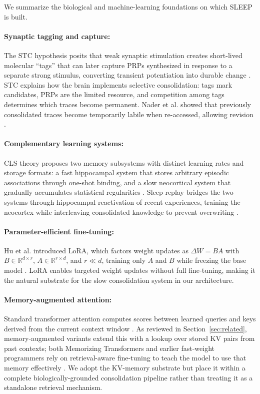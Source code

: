 We summarize the biological and machine-learning foundations on which SLEEP is built.

\paragraph{Synaptic tagging and capture:}
The STC hypothesis posits that weak synaptic stimulation creates short-lived molecular ``tags'' that can later capture PRPs synthesized in response to a separate strong stimulus, converting transient potentiation into durable change \citep{frey1997synaptic,redondo2011making}. STC explains how the brain implements selective consolidation: tags mark candidates, PRPs are the limited resource, and competition among tags determines which traces become permanent. Nader et al. showed that previously consolidated traces become temporarily labile when re-accessed, allowing revision \citep{nader2000fear}.

\paragraph{Complementary learning systems:}
CLS theory proposes two memory subsystems with distinct learning rates and storage formats: a fast hippocampal system that stores arbitrary episodic associations through one-shot binding, and a slow neocortical system that gradually accumulates statistical regularities \citep{mcclelland1995why}. Sleep replay bridges the two systems through hippocampal reactivation of recent experiences, training the neocortex while interleaving consolidated knowledge to prevent overwriting \citep{wilson1994reactivation,diekelmann2010memory}.

\paragraph{Parameter-efficient fine-tuning:}
Hu et al. introduced LoRA, which factors weight updates as $\Delta W = BA$ with $B \in \mathbb{R}^{d \times r}$, $A \in \mathbb{R}^{r \times d}$, and $r \ll d$, training only $A$ and $B$ while freezing the base model \citep{hu2021lora}. LoRA enables targeted weight updates without full fine-tuning, making it the natural substrate for the slow consolidation system in our architecture.

\paragraph{Memory-augmented attention:}
Standard transformer attention computes scores between learned queries and keys derived from the current context window \citep{vaswani2017attention}. As reviewed in Section~\ref{sec:related}, memory-augmented variants extend this with a lookup over stored KV pairs from past contexts; both Memorizing Transformers and earlier fast-weight programmers rely on retrieval-aware fine-tuning to teach the model to use that memory effectively \citep{wu2022memorizing,schmidhuber1992learning}. We adopt the KV-memory substrate but place it within a complete biologically-grounded consolidation pipeline rather than treating it as a standalone retrieval mechanism.

